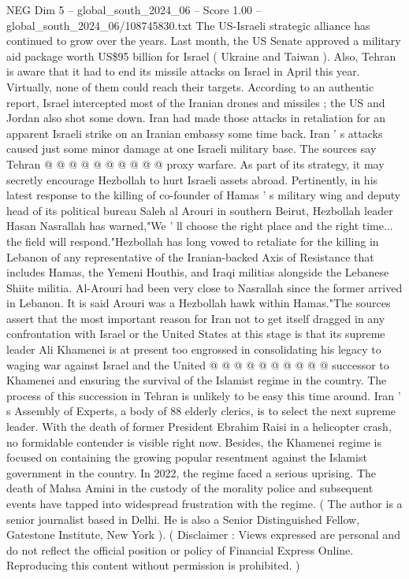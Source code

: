 \begin{textsample}{NEG Dim 5 – global\_south\_2024\_06 – Score 1.00 – global\_south\_2024\_06/108745830.txt}
The US-Israeli strategic alliance has continued to grow over the years.
Last month, the US Senate approved a military aid package worth US\$95 billion for Israel ( Ukraine and Taiwan ).
Also, Tehran is aware that it had to end its missile attacks on Israel in April this year.
Virtually, none of them could reach their targets.
According to an authentic report, Israel intercepted most of the Iranian drones and missiles ; the US and Jordan also shot some down.
Iran had made those attacks in retaliation for an apparent Israeli strike on an Iranian embassy some time back.
Iran ' s attacks caused just some minor damage at one Israeli military base.
The sources say Tehran @ @ @ @ @ @ @ @ @ @ proxy warfare.
As part of its strategy, it may secretly encourage Hezbollah to hurt Israeli assets abroad.
Pertinently, in his latest response to the killing of co-founder of Hamas ' s military wing and deputy head of its political bureau Saleh al Arouri in southern Beirut, Hezbollah leader Hasan Nasrallah has warned,"We ' ll choose the right place and the right time... the field will respond."Hezbollah has long vowed to retaliate for the killing in Lebanon of any representative of the Iranian-backed Axis of Resistance that includes Hamas, the Yemeni Houthis, and Iraqi militias alongside the Lebanese Shiite militia.
Al-Arouri had been very close to Nasrallah since the former arrived in Lebanon.
It is said Arouri was a Hezbollah hawk within Hamas."The sources assert that the most important reason for Iran not to get itself dragged in any confrontation with Israel or the United States at this stage is that its supreme leader Ali Khamenei is at present too engrossed in consolidating his legacy to waging war against Israel and the United @ @ @ @ @ @ @ @ @ @ successor to Khamenei and ensuring the survival of the Islamist regime in the country.
The process of this succession in Tehran is unlikely to be easy this time around.
Iran ' s Assembly of Experts, a body of 88 elderly clerics, is to select the next supreme leader.
With the death of former President Ebrahim Raisi in a helicopter crash, no formidable contender is visible right now.
Besides, the Khamenei regime is focused on containing the growing popular resentment against the Islamist government in the country.
In 2022, the regime faced a serious uprising.
The death of Mahsa Amini in the custody of the morality police and subsequent events have tapped into widespread frustration with the regime. ( The author is a senior journalist based in Delhi.
He is also a Senior Distinguished Fellow, Gatestone Institute, New York ). ( Disclaimer : Views expressed are personal and do not reflect the official position or policy of Financial Express Online.
Reproducing this content without permission is prohibited. )

\end{textsample}
